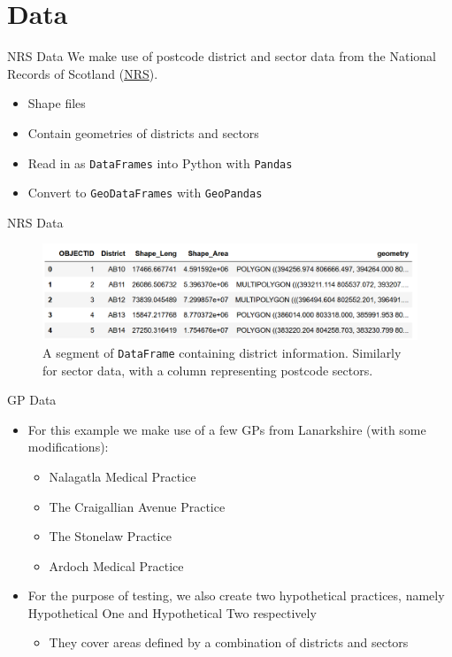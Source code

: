 \documentclass[hyperref={breaklinks,colorlinks,
   urlcolor=blue,citecolor=blue,linkcolor=red}]{beamer}
\newcommand{\Python}{{\sc Python}\xspace}
\begin{document}
\section{Data}
\begin{frame}{NRS Data}
We make use of postcode district
and sector data from the National Records of Scotland (\href{https://www.nrscotland.gov.uk/statistics-and-data/geography/nrs-postcode-extract}{NRS}).
\begin{itemize}
\item{Shape files}
\item{Contain geometries of districts and sectors}
\item{Read in as \texttt{DataFrames} into \Python with
\texttt{Pandas}}
\item{Convert to \texttt{GeoDataFrames} with \texttt{GeoPandas}}
\end{itemize}
\end{frame}

\begin{frame}{NRS Data}
\begin{figure}
\begin{center}
\includegraphics[scale=0.5]{districtcolumns}
\caption{A segment of \texttt{DataFrame} containing district information. Similarly for sector data, with a column
representing postcode sectors.}
\end{center}
\end{figure}
\end{frame}

\begin{frame}{GP Data}
\begin{itemize}
\item{For this example we make use of a few GPs from Lanarkshire (with some modifications):}
\begin{itemize}
\item{Nalagatla Medical Practice}
\item{The Craigallian Avenue Practice}
\item{The Stonelaw Practice}
\item{Ardoch Medical Practice}
\end{itemize}
\item{For the purpose of testing, we also create two hypothetical practices, namely Hypothetical One and Hypothetical Two respectively}
\begin{itemize}
\item{They cover areas defined by a combination of districts and sectors}
\end{itemize}
\end{itemize}
\end{frame}
\end{document}
